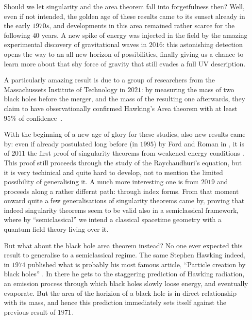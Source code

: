 Should we let singularity and the area theorem fall into forgetfulness then? Well, even if not intended, the golden age of these results came to its sunset already in the early \(1970s\), and developments in this area remained rather scarce for the following \(40\) years. A new spike of energy was injected in the field by the amazing experimental discovery of gravitational waves in \(2016\): this astonishing detection opens the way to an all new horizon of possibilities, finally giving us a chance to learn more about that shy force of gravity that still evades a full UV description.

A particularly amazing result is due to a group of researchers from the Massachussets Institute of Technology in \(2021\): by measuring the mass of two black holes before the merger, and the mass of the resulting one afterwards, they claim to have observationally confirmed Hawking's Area theorem with at least \(95\%\) of confidence~\cite[]{PhysRevLett.127.011103}.

With the beginning of a new age of glory for these studies, also new results came by: even if already postulated long before (in \(1995\)) by Ford and Roman in \cite[]{ford1996averaged}, it is of \(2011\) the first proof of singularity theorems from weakened energy conditions \cite[]{fewster2011singularity}. This proof still proceeds through the study of the Raychaudhuri's equation, but it is very techinical and quite hard to develop, not to mention the limited possibility of generalising it. A much more interesting one is from \(2019\) \cite[]{fewster2020new} and proceeds along a rather differnt path: through index forms.
From that moment onward quite a few generalisations of singularity theorems came by, proving that indeed singularity theorems seem to be valid also in a semiclassical framework, where by ``semiclassical'' we intend a classical spacetime geometry with a quantum field theory living over it.

But what about the black hole area theorem instead? No one ever expected this result to generalise to a semiclassical regime. The same Stephen Hawking indeed, in \(1974\) published what is probably his most famous article, ``Particle creation by black holes'' \cite[]{hawking1975particle}. In there he gets to the staggering prediction of Hawking radiation, an emission process through which black holes slowly loose energy, and eventually evaporate. But the area of the horizion of a black hole is in direct relationship with its mass, and hence this prediction immediately sets itself against the previous result of \(1971\).

